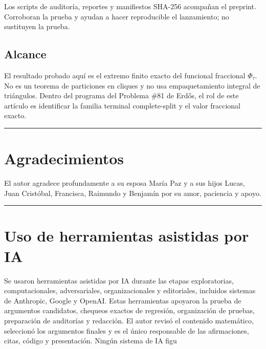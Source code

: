 \documentclass[
  11pt,
]{article}
\begin{document}
Los scripts de auditoría, reportes y manifiestos SHA-256 acompañan el
preprint. Corroboran la prueba y ayudan a hacer reproducible el
lanzamiento; no sustituyen la prueba.

\subsection{Alcance}\label{alcance}

El resultado probado aquí es el extremo finito exacto del funcional
fraccional \(\Phi_\tau\). No es un teorema de particiones en cliques y
no usa empaquetamiento integral de triángulos. Dentro del programa del
Problema \#81 de Erdős, el rol de este artículo es identificar la
familia terminal complete-split y el valor fraccional exacto.

\begin{center}\rule{0.5\linewidth}{0.5pt}\end{center}

\section{Agradecimientos}\label{agradecimientos}

El autor agradece profundamente a su esposa María Paz y a sus hijos
Lucas, Juan Cristóbal, Francisca, Raimundo y Benjamín por su amor,
paciencia y apoyo.

\begin{center}\rule{0.5\linewidth}{0.5pt}\end{center}

\section{Uso de herramientas asistidas por
IA}\label{uso-de-herramientas-asistidas-por-ia}

Se usaron herramientas asistidas por IA durante las etapas
exploratorias, computacionales, adversariales, organizacionales y
editoriales, incluidos sistemas de Anthropic, Google y OpenAI. Estas
herramientas apoyaron la prueba de argumentos candidatos, chequeos
exactos de regresión, organización de pruebas, preparación de auditorías
y redacción. El autor revisó el contenido matemático, seleccionó los
argumentos finales y es el único responsable de las afirmaciones, citas,
código y presentación. Ningún sistema de IA figu
\end{document}
